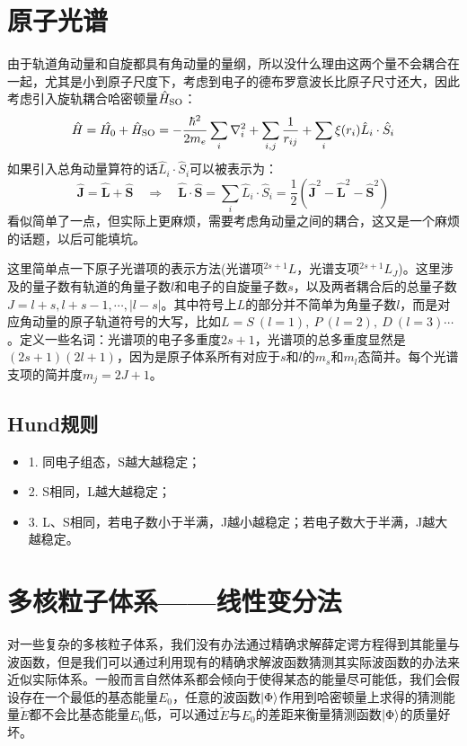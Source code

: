 \section{原子光谱}
由于轨道角动量和自旋都具有角动量的量纲，所以没什么理由这两个量不会耦合在一起，尤其是小到原子尺度下，考虑到电子的德布罗意波长比原子尺寸还大，因此考虑引入旋轨耦合哈密顿量$\hat{H}_{\rm{SO}}$：
\[\hat{H}=\hat{H_0}+\hat{H}_{\rm{SO}}=-\frac{\hbar^2}{2m_e}\sum_i\nabla^2_i+\sum_{i,j}\frac{1}{r_{ij}}+\sum_{i}\xi(r_i)\hat{L}_i\cdot\hat{S}_i\]
如果引入总角动量算符的话$\hat{L}_i \cdot \hat{S}_i$可以被表示为：
\[\hat{\bm{J}}=\hat{\bm{L}}+\hat{\bm{S}} \quad \Rightarrow \quad \hat{\bm{L}}\cdot\hat{\bm{S}}=\sum_i\hat{L}_i\cdot\hat{S}_i=\frac{1}{2}(\hat{\bm{J}}^2-\hat{\bm{L}}^2-\hat{\bm{S}}^2)\]
看似简单了一点，但实际上更麻烦，需要考虑角动量之间的耦合，这又是一个麻烦的话题，以后可能填坑。

这里简单点一下原子光谱项的表示方法(光谱项$^{2s+1}L$，光谱支项$^{2s+1}L_J$)。这里涉及的量子数有轨道的角量子数$l$和电子的自旋量子数$s$，以及两者耦合后的总量子数$J=l+s,l+s-1,\cdots,|l-s|$。其中符号上$L$的部分并不简单为角量子数$l$，而是对应角动量的原子轨道符号的大写，比如$L=S \ (l=1), \ P \ (l=2), \ D \ (l=3)\cdots$。定义一些名词：光谱项的电子多重度$2s+1$，光谱项的总多重度显然是$(2s+1)(2l+1)$，因为是原子体系所有对应于$s$和$l$的$m_s$和$m_l$态简并。每个光谱支项的简并度$m_j=2J+1$。

\subsection{Hund规则}
\begin{itemize}
    \item 1. 同电子组态，S越大越稳定；
    \item 2. S相同，L越大越稳定；
    \item 3. L、S相同，若电子数小于半满，J越小越稳定；若电子数大于半满，J越大越稳定。
\end{itemize}

\newpage
\section{多核粒子体系——线性变分法}
对一些复杂的多核粒子体系，我们没有办法通过精确求解薛定谔方程得到其能量与波函数，但是我们可以通过利用现有的精确求解波函数猜测其实际波函数的办法来近似实际体系。一般而言自然体系都会倾向于使得某态的能量尽可能低，我们会假设存在一个最低的基态能量$E_0$，任意的波函数$\ket{\Phi}$作用到哈密顿量上求得的猜测能量$\tilde{E}$都不会比基态能量$E_0$低，可以通过$\tilde{E}$与$E_0$的差距来衡量猜测函数$\ket{\Phi}$的质量好坏。


